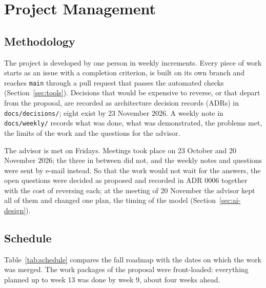 \chapter{Project Management}\label{ch:management}

\section{Methodology}
The project is developed by one person in weekly increments. Every piece of work starts as an
issue with a completion criterion, is built on its own branch and reaches \texttt{main} through a
pull request that passes the automated checks (Section~\ref{sec:tools}). Decisions that would be
expensive to reverse, or that depart from the proposal, are recorded as architecture decision
records (ADRs) in \texttt{docs/decisions/}; eight exist by 23 November 2026. A weekly note in
\texttt{docs/weekly/} records what was done, what was demonstrated, the problems met, the limits
of the work and the questions for the advisor.

The advisor is met on Fridays. Meetings took place on 23 October and 20 November 2026; the three
in between did not, and the weekly notes and questions were sent by e-mail instead. So that the
work would not wait for the answers, the open questions were decided as proposed and recorded in
ADR 0006 together with the cost of reversing each; at the meeting of 20 November the advisor kept
all of them and changed one plan, the timing of the model (Section~\ref{sec:ai-design}).

\section{Schedule}
Table~\ref{tab:schedule} compares the fall roadmap with the dates on which the work was merged.
The work packages of the proposal were front-loaded: everything planned up to week 13 was done
by week 9, about four weeks ahead.

